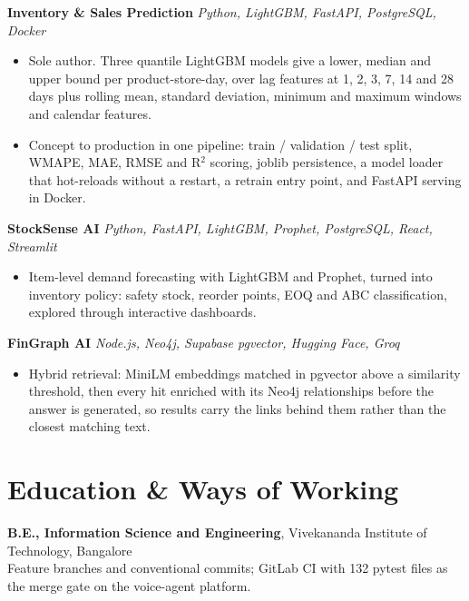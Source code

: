 \documentclass[10pt,a4paper]{article}
\begin{document}
\vspace{1pt}
\textbf{Inventory \& Sales Prediction} \textit{Python, LightGBM, FastAPI, PostgreSQL, Docker}
\begin{itemize}
  \item Sole author. Three quantile LightGBM models give a lower, median and upper bound per
        product-store-day, over lag features at 1, 2, 3, 7, 14 and 28 days plus rolling mean,
        standard deviation, minimum and maximum windows and calendar features.
  \item Concept to production in one pipeline: train / validation / test split, WMAPE, MAE, RMSE and
        R$^2$ scoring, joblib persistence, a model loader that hot-reloads without a restart, a
        retrain entry point, and FastAPI serving in Docker.
\end{itemize}

\vspace{1pt}
\textbf{StockSense AI} \textit{Python, FastAPI, LightGBM, Prophet, PostgreSQL, React, Streamlit}
\begin{itemize}
  \item Item-level demand forecasting with LightGBM and Prophet, turned into inventory policy: safety
        stock, reorder points, EOQ and ABC classification, explored through interactive dashboards.
\end{itemize}

\vspace{1pt}
\textbf{FinGraph AI} \textit{Node.js, Neo4j, Supabase pgvector, Hugging Face, Groq}
\begin{itemize}
  \item Hybrid retrieval: MiniLM embeddings matched in pgvector above a similarity threshold, then
        every hit enriched with its Neo4j relationships before the answer is generated, so results
        carry the links behind them rather than the closest matching text.
\end{itemize}

\section{Education \& Ways of Working}
\textbf{B.E., Information Science and Engineering}, Vivekananda Institute of Technology, Bangalore\\
Feature branches and conventional commits; GitLab CI with 132 pytest files as the merge gate on the
voice-agent platform.
\end{document}
